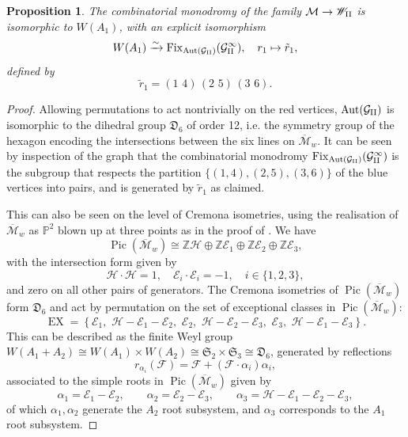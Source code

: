 \documentclass[a4paper,reqno]{amsart}
\numberwithin{equation}{section}
\newcommand{\Z}{\mathbb{Z}}
\newcommand{\p}{\mathbb{P}}
\newcommand{\E}{\mathcal{E}}
\newcommand{\h}{\mathcal{H}}
\newcommand{\Pic}{\operatorname{Pic}}
\DeclareMathOperator{\Aut}{Aut}
\newtheorem{proposition}[theorem]{Proposition}
\numberwithin{equation}{section}
\begin{document}
\begin{proposition} \label{prop:combinatorialmonodromyPII}
    The combinatorial monodromy of the family $\mathcal{M}\to \mathscr{W}_{\rm{II}}$ is isomorphic to $W(A_1)$, with an explicit isomorphism
    \begin{equation*}
        W(A_1) \xrightarrow{\sim}   \operatorname{Fix}_{\operatorname{Aut}(\mathcal{G}_{\rm{II}})}(\mathcal{G}_{\rm{II}}^\infty), \quad r_1\mapsto \tilde{r}_1,
    \end{equation*}
defined by 
$$    \tilde{r}_1= (1\,\, 4)\,(2\,\,5)\,(3\,\,6).$$
\end{proposition}
\begin{proof}
Allowing permutations to act nontrivially on the red vertices, $\Aut(\mathcal{G}_{\rm{II}})$ is isomorphic to the dihedral group $\mathfrak{D}_6$ of order 12, i.e. the symmetry group of the hexagon encoding the intersections between the six lines on $\overline{\mathcal{M}}_{w}$.
It can be seen by inspection of the graph that the combinatorial monodromy $\operatorname{Fix}_{\operatorname{Aut}(\mathcal{G}_{\rm{II}})}(\mathcal{G}_{\rm{II}}^\infty)$ is the subgroup that respects the partition $\{(1,4),(2,5),(3,6)\}$ of the blue vertices into pairs, and is generated by $\tilde{r}_1$ as claimed.

This can also be seen on the level of Cremona isometries, using the realisation of $\overline{\mathcal{M}}_w$ as $\p^2$ blown up at three points as in the proof of .
We have 
$$\Pic(\overline{\mathcal{M}}_w)\cong \Z\mathcal{H}\oplus \Z \mathcal{E}_1\oplus\Z\mathcal{E}_2\oplus \Z \mathcal{E}_3,$$
with the intersection form given by 
$$\mathcal{H}\cdot \mathcal{H}=1, \quad \mathcal{E}_i \cdot \mathcal{E}_i=-1,\quad i \in \{1,2,3\},$$
and zero on all other pairs of generators.
    The Cremona isometries of $\Pic(\overline{\mathcal{M}}_w)$ form $\mathfrak{D}_6$ and act by permutation on the set of exceptional classes in $\Pic(\overline{\mathcal{M}}_w)$:
    $$\operatorname{EX} = 
    \left\{\mathcal{E}_1,\,\,
    \mathcal{H}-\mathcal{E}_1-\mathcal{E}_2,\,\,
    \mathcal{E}_2,\,\,
    \mathcal{H}-\mathcal{E}_2-\mathcal{E}_3, \,\,
    \mathcal{E}_3, \,\,
    \mathcal{H}-\mathcal{E}_1-\mathcal{E}_3\right\}.$$
    This can be described as the finite Weyl group $W(A_1+A_2)\cong W(A_1)\times W(A_2)\cong \mathfrak{S}_2\times \mathfrak{S}_3\cong \mathfrak{D}_6$, generated by reflections 
    $$r_{\alpha_i}(\mathcal{F})=\mathcal{F}+\left( \mathcal{F}\cdot \alpha_i\right) \alpha_i,$$
    associated to the
    simple roots in $\Pic(\overline{\mathcal{M}}_w)$ given by
    $$\alpha_1 = \E_1-\E_2, \qquad \alpha_2 = \E_2-\E_3, \qquad \alpha_3 = \h-\E_1-\E_2-\E_3,$$
    of which $\alpha_1,\alpha_2$ generate the $A_2$ root subsystem, and $\alpha_3$ corresponds to the $A_1$ root subsystem.
    

\end{proof}
\end{document}
